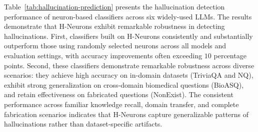 \documentclass[dvipsnames]{article}
\begin{document}







Table~\ref{tab:hallucination-prediction} presents the hallucination detection performance of neuron-based classifiers across six widely-used LLMs. The results demonstrate that H-Neurons exhibit remarkable robustness in detecting hallucinations. First, classifiers built on H-Neurons consistently and substantially outperform those using randomly selected neurons across all models and evaluation settings, with accuracy improvements often exceeding $10$ percentage points. Second, these classifiers demonstrate remarkable robustness across diverse scenarios: they achieve high accuracy on in-domain datasets (TriviaQA and NQ), exhibit strong generalization on cross-domain biomedical questions (BioASQ), and retain effectiveness on fabricated questions (NonExist). The consistent performance across familiar knowledge recall, domain transfer, and complete fabrication scenarios indicates that H-Neurons capture generalizable patterns of hallucinations rather than dataset-specific artifacts.
\end{document}
